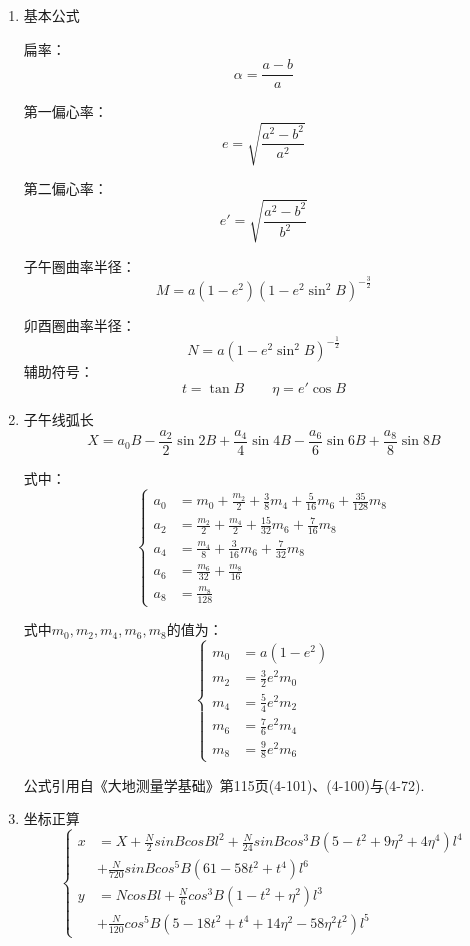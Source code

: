 \begin{enumerate}
 \item 基本公式

扁率：
$$\alpha=\frac{a-b}{a}$$

第一偏心率：
$$e=\sqrt{\frac{a^2-b^2}{a^2}}$$

第二偏心率：
$$e'=\sqrt{\frac{a^{2}-b^{2}}{b^{2}}}$$

子午圈曲率半径：
$$M=a(1-e^2)(1-e^2\sin ^2 B)^{-\frac{3}{2}}$$

卯酉圈曲率半径：
$$N=a(1-e^2\sin ^2 B)^{-\frac{1}{2}}$$
辅助符号：
$$t=\tan B\qquad\eta=e'\cos B$$

\item 子午线弧长
$$X=a_0 B - \frac{a_2}{2}\sin 2B + \frac{a_4}{4}\sin 4B 
- \frac{a_6}{6} \sin 6B  + \frac{a_8}{8}\sin 8B$$

式中：
\[
\left \{ \begin{aligned}
a_0 &= m_0 + \frac{m_2}{2} + \frac{3}{8}m_4 + \frac{5}{16}m_6 + \frac{35}{128}m_8  \\
a_2 &= \frac{m_2}{2} + \frac{m_4}{2} + \frac{15}{32}m_6 + \frac{7}{16}m_8  \\
a_4 &= \frac{m_4}{8} + \frac{3}{16}m_6 + \frac{7}{32}m_8  \\
a_6 &= \frac{m_6}{32} + \frac{m_8}{16}  \\
a_8 &= \frac{m_8}{128}
\end{aligned} \right.
\]

式中$m_0, m_2, m_4, m_6, m_8$的值为：
\[
\left \{ \begin{aligned}
m_0 &= a(1-e^2) \\
m_2 &= \frac{3}{2}e^2 m_0  \\
m_4 &= \frac{5}{4}e^2 m_2   \\
m_6 &= \frac{7}{6}e^2 m_4   \\
m_8 &= \frac{9}{8}e^2 m_6 
\end{aligned} \right.
\]

公式引用自《大地测量学基础》第115页(4-101)、(4-100)与(4-72).


\item 坐标正算
\[
\left \{ \begin{aligned}
x&=X+\frac{N}{2}sinBcosBl^2 +\frac{N}{24}sinBcos^3B(5-t^2 +9\eta^2+4\eta^4)l^4 \\
  &+\frac{N}{720}sinBcos^5 B(61-58t^2 +t^4)l^6  \\
y&=NcosBl+\frac{N}{6}cos^3 B(1-t^2 +\eta^2 )l^3 \\
        &+\frac{N}{120}cos^5 B (5-18t^2+t^4 +14\eta^2 -58\eta^2t^2)l^5
\end{aligned} \right.
\]



\end{enumerate}
